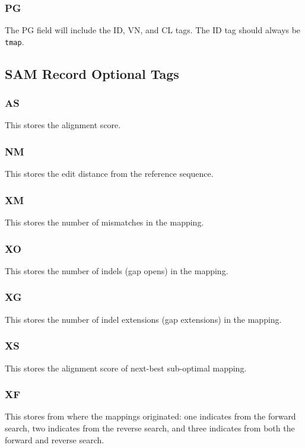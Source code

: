 \documentclass[a4paper,12pt]{book}
\newcommand{\TT}[1]{{\tt #1}} %
\begin{document}
\subsubsection{PG}
The PG field will include the ID, VN, and CL tags.
The ID tag should always be \TT{tmap}.

\subsection{SAM Record Optional Tags}

\subsubsection{AS}
This stores the alignment score.

\subsubsection{NM}
This stores the edit distance from the reference sequence.

\subsubsection{XM}
This stores the number of mismatches in the mapping.

\subsubsection{XO}
This stores the number of indels (gap opens) in the mapping.

\subsubsection{XG}
This stores the number of indel extensions (gap extensions) in the mapping.

\subsubsection{XS}
This stores the alignment score of next-best sub-optimal mapping.

\subsubsection{XF}
This stores from where the mappings originated: one indicates from the forward search, two indicates from the reverse search, and three indicates from both the forward and reverse search.
\end{document}
